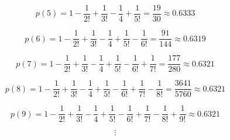 \begin{Answer}
\begin{equation}
p(5) = 1 - \frac{1}{2!} + \frac{1}{3!} - \frac{1}{4} + \frac{1}{5!} = \frac{19}{30} \approx 0.6333
\end{equation}

\begin{equation}
p(6) = 1 - \frac{1}{2!} + \frac{1}{3!} - \frac{1}{4} + \frac{1}{5!} - \frac{1}{6!} = \frac{91}{144} \approx 0.6319
\end{equation}

\begin{equation}
p(7) = 1 - \frac{1}{2!} + \frac{1}{3!} - \frac{1}{4} + \frac{1}{5!} - \frac{1}{6!} + \frac{1}{7!} = \frac{177}{280} \approx 0.6321
\end{equation}

\begin{equation}
p(8) = 1 - \frac{1}{2!} + \frac{1}{3!} - \frac{1}{4} + \frac{1}{5!} - \frac{1}{6!} + \frac{1}{7!} - \frac{1}{8!} = \frac{3641}{5760} \approx 0.6321
\end{equation}

\begin{equation}
p(9) = 1 - \frac{1}{2!} + \frac{1}{3!} - \frac{1}{4} + \frac{1}{5!} - \frac{1}{6!} + \frac{1}{7!} - \frac{1}{8!} + \frac{1}{9!} \approx 0.6321
\end{equation}

\begin{equation*}
\vdots
\end{equation*}

\noindent
{}
\end{Answer}
